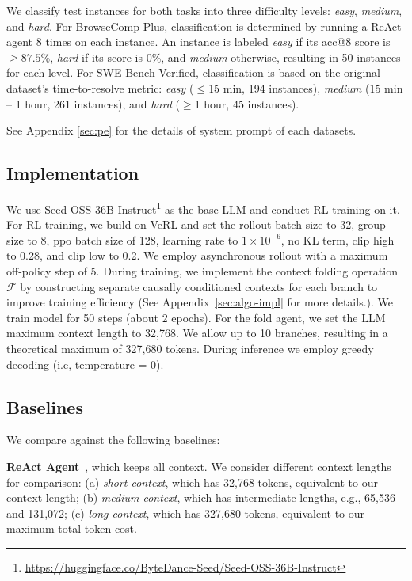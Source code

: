 We classify test instances for both tasks into three difficulty levels: \textit{easy}, \textit{medium}, and \textit{hard}. For BrowseComp-Plus, classification is determined by running a ReAct agent 8 times on each instance. An instance is labeled \textit{easy} if its acc@8 score is $\geq87.5\%$, \textit{hard} if its score is 0\%, and \textit{medium} otherwise, resulting in 50 instances for each level. For SWE-Bench Verified, classification is based on the original dataset's time-to-resolve metric: \textit{easy} ($\le$15 min, 194 instances), \textit{medium} (15 min -- 1 hour, 261 instances), and \textit{hard} ($\ge$1 hour, 45 instances).

See Appendix \ref{sec:pe} for the details of system prompt of each datasets.

\subsection{Implementation}
We use Seed-OSS-36B-Instruct\footnote{\url{https://huggingface.co/ByteDance-Seed/Seed-OSS-36B-Instruct}} as the base LLM and conduct RL training on it.  
For RL training, we build on VeRL and set the rollout batch size to 32, group size to 8, ppo batch size of 128, learning rate to $1 \times 10^{-6}$, no KL term, clip high to 0.28, and clip low to 0.2.  
We employ asynchronous rollout with a maximum off-policy step of 5.  
During training, we implement the context folding operation $\mathcal{F}$ by constructing separate causally conditioned contexts for each branch to improve training efficiency (See Appendix~\ref{sec:algo-impl} for more details.). 
We train model for 50 steps (about 2 epochs).
For the fold agent, we set the LLM maximum context length to 32,768.
We allow up to 10 branches, resulting in a theoretical maximum of 327,680 tokens.
During inference we employ greedy decoding (i.e, temperature = 0).



\subsection{Baselines}
We compare against the following baselines:

\noindent \textbf{ReAct Agent}~\citep{Yao2022ReActSR}, which keeps all context. We consider different context lengths for comparison: (a) \textit{short-context}, which has 32,768 tokens, equivalent to our context length; (b) \textit{medium-context}, which has intermediate lengths, e.g., 65,536 and 131,072; (c) \textit{long-context}, which has 327,680 tokens, equivalent to our maximum total token cost.


